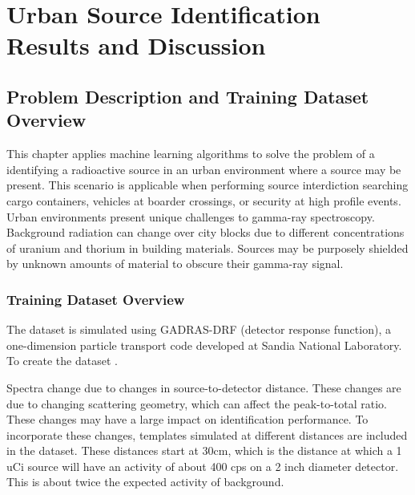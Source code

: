 \chapter{Urban Source Identification Results and Discussion}





\section{Problem Description and Training Dataset Overview}

This chapter applies machine learning algorithms to solve the problem of a identifying a radioactive source in an urban environment where a source may be present. This scenario is applicable when performing source interdiction searching cargo containers, vehicles at boarder crossings, or security at high profile events. Urban environments present unique challenges to gamma-ray spectroscopy. Background radiation can change over city blocks due to different concentrations of uranium and thorium in building materials. Sources may be purposely shielded by unknown amounts of material to obscure their gamma-ray signal.


\subsection{Training Dataset Overview}

The dataset is simulated using GADRAS-DRF (detector response function), a one-dimension particle transport code developed at Sandia National Laboratory. To create the dataset .

Spectra change due to changes in source-to-detector distance. These changes are due to changing scattering geometry, which can affect the peak-to-total ratio. These changes may have a large impact on identification performance. To incorporate these changes, templates simulated at different distances are included in the dataset. These distances start at 30cm, which is the distance at which a 1 uCi source will have an activity of about 400 cps on a 2 inch diameter detector. This is about twice the expected activity of background. 

